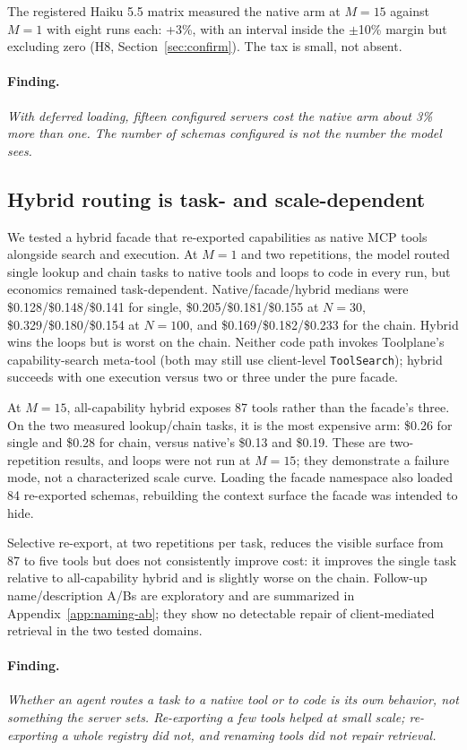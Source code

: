\documentclass[10pt,twocolumn]{article}
\newcommand{\usd}[1]{\$#1}
\newcommand{\finding}[1]{\paragraph{Finding.} \emph{#1}}
\begin{document}
The registered Haiku 5.5 matrix measured the native arm at $M=15$ against
$M=1$ with eight runs each: +3\%, with an interval inside the $\pm$10\% margin
but excluding zero (H8, Section~\ref{sec:confirm}).  The tax is small, not
absent.

\finding{With deferred loading, fifteen configured servers cost the native arm about
3\% more than one.  The number of schemas configured is not the number the
model sees.}

\subsection{Hybrid routing is task- and scale-dependent}

We tested a hybrid facade that re-exported capabilities as native MCP tools
alongside search and execution.  At $M=1$ and two repetitions, the model routed
single lookup and chain tasks to native tools and loops to code in every run,
but economics remained task-dependent.  Native/facade/hybrid medians were
\usd{0.128}/\usd{0.148}/\usd{0.141} for single,
\usd{0.205}/\usd{0.181}/\usd{0.155} at $N=30$,
\usd{0.329}/\usd{0.180}/\usd{0.154} at $N=100$, and
\usd{0.169}/\usd{0.182}/\usd{0.233} for the chain.  Hybrid wins the loops but
is worst on the chain.  Neither code path invokes Toolplane's capability-search
meta-tool (both may still use client-level
\texttt{ToolSearch}); hybrid succeeds with one execution versus two or three
under the pure facade.

At $M=15$, all-capability hybrid exposes 87 tools rather than the facade's
three.  On the two measured lookup/chain tasks, it is the most expensive
arm: \usd{0.26} for single and \usd{0.28} for chain, versus native's
\usd{0.13} and \usd{0.19}.  These are two-repetition results, and loops were
not run at $M=15$; they demonstrate a failure mode, not a characterized scale
curve.  Loading the facade namespace also loaded 84 re-exported schemas,
rebuilding the context surface the facade was intended to hide.

Selective re-export, at two repetitions per task, reduces the visible surface
from 87 to five tools but does not consistently improve cost: it improves the
single task relative to all-capability hybrid and is slightly worse on the
chain.  Follow-up name/description A/Bs are exploratory and are summarized in
Appendix~\ref{app:naming-ab}; they show no detectable repair of
client-mediated retrieval in the two tested domains.

\finding{Whether an agent routes a task to a native tool or to code is its own
behavior, not something the server sets.  Re-exporting a few tools helped at
small scale; re-exporting a whole registry did not, and renaming tools did
not repair retrieval.}
\end{document}
